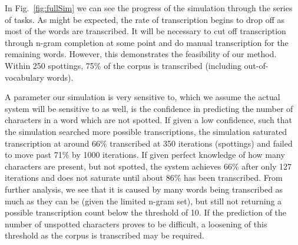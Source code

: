\documentclass[ms]{byuprop}
\begin{document}
In Fig.~\ref{fig:fullSim} we can see the progress of the simulation through the series of tasks. As might be expected, the rate of transcription begins to drop off as most of the words are transcribed. It will be necessary to cut off transcription through n-gram completion at some point and do manual transcription for the remaining words. However, this demonstrates the feasibility of our method. Within 250 spottings, 75\% of the corpus is transcribed (including out-of-vocabulary words).

A parameter our simulation is very sensitive to, which we assume the actual system will be sensitive to as well, is the confidence in predicting the number of characters in a word which are not spotted. If given a low confidence, such that the simulation searched more possible transcriptions, the simulation saturated transcription at around 66\% transcribed at 350 iterations (spottings) and failed to move past 71\% by 1000 iterations. If given perfect knowledge of how many characters are present, but not spotted, the system achieves 66\% after only 127 iterations and does not saturate until about 86\% has been transcribed. From further analysis, we see that it is caused by many words being transcribed as much as they can be (given the limited n-gram set), but still not returning a possible transcription count below the threshold of 10. If the prediction of the number of unspotted characters proves to be difficult, a loosening of this threshold as the corpus is transcribed may be required.
\end{document}
